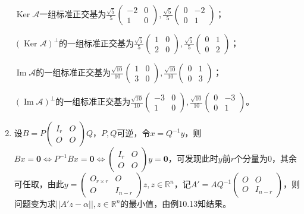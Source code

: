 \documentclass[a4paper,UTF8,fontset=windows]{ctexart}
\DeclareMathOperator{\im}{Im}
\DeclareMathOperator{\Ker}{Ker}
\begin{document}
\begin{enumerate}
$\Ker\mathcal{A}$一组标准正交基为$\frac{\sqrt5}{5}\begin{pmatrix}-2&0\\1&0\end{pmatrix},\frac{\sqrt5}{5}\begin{pmatrix}0&-2\\0&1\end{pmatrix}$；

$(\Ker\mathcal{A})^\bot$的一组标准正交基为$\frac{\sqrt5}{5}\begin{pmatrix}1&0\\2&0\end{pmatrix},\frac{\sqrt5}{5}\begin{pmatrix}0&1\\0&2\end{pmatrix}$；

$\im\mathcal{A}$的一组标准正交基为$\frac{\sqrt{10}}{10}\begin{pmatrix}1&0\\3&0\end{pmatrix},\frac{\sqrt{10}}{10}\begin{pmatrix}0&1\\0&3\end{pmatrix}$；

$(\im\mathcal{A})^\bot$的一组标准正交基为$\frac{\sqrt{10}}{10}\begin{pmatrix}-3&0\\1&0\end{pmatrix},\frac{\sqrt{10}}{10}\begin{pmatrix}0&-3\\0&1\end{pmatrix}$。

\item
设$B=P\begin{pmatrix}I_r&O\\O&O\end{pmatrix}Q$，$P,Q$可逆，令$x=Q^{-1}y$，则$Bx=\mathbf{0}\Leftrightarrow P^{-1}Bx=\mathbf{0}\Leftrightarrow\begin{pmatrix}I_r&O\\O&O\end{pmatrix}y=\mathbf{0}$，可发现此时$y$前$r$个分量为0，其余可任取，由此$y=\begin{pmatrix}O_{r\times r}&O\\O&I_{n-r}\end{pmatrix}z,z\in\mathbb{R}^n$，记$A'=AQ^{-1}\begin{pmatrix}O&O\\O&I_{n-r}\end{pmatrix}$，则问题变为求$||A'z-\alpha||,z\in\mathbb{R}^n$的最小值，由例10.13知结果。


\end{enumerate}
\end{document}
